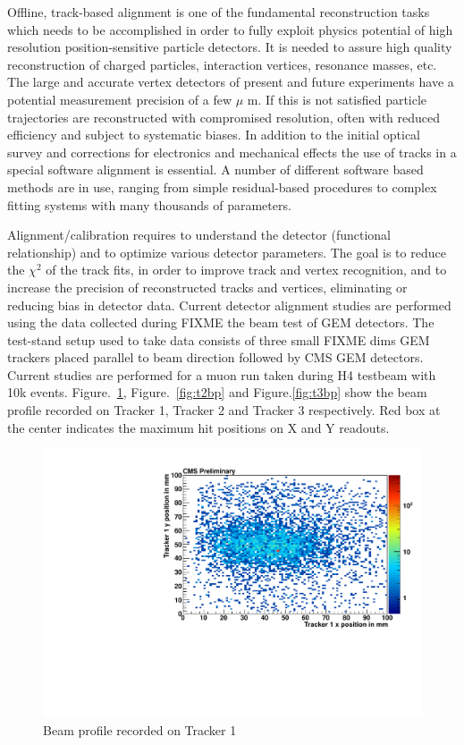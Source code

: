 Offline, track-based alignment is one of the fundamental reconstruction tasks which needs to be accomplished in order to fully exploit physics potential of high resolution position-sensitive particle detectors. It is needed to assure high quality reconstruction of charged particles, interaction vertices, resonance masses, etc. The large and accurate vertex detectors of present and future experiments have a potential measurement precision of a few $\mu$ m. If this is not satisfied particle trajectories are reconstructed with compromised resolution, often with reduced efficiency and subject to systematic biases. In addition to the initial optical survey and corrections for electronics and mechanical effects the use of tracks in a special software alignment is essential. A number of different software based methods are in use, ranging from simple residual-based procedures to complex fitting systems with many thousands of parameters.

Alignment/calibration requires to understand the detector (functional relationship) and to optimize various detector  parameters. The goal is to reduce the $\chi^{2}$ of the track fits, in order to improve track and vertex recognition, and to increase the precision of reconstructed tracks and vertices, eliminating or reducing bias in detector data.
Current detector alignment studies are performed using the data collected during FIXME the beam test of GEM detectors. The test-stand setup used to take data consists of three small FIXME dims GEM trackers placed parallel to beam direction followed by CMS GEM detectors. 
Current studies are performed for a muon run taken during H4 testbeam with 10k events.
Figure.~\ref{fig:t1bp}, Figure.~\ref{fig:t2bp} and Figure.\ref{fig:t3bp} show the beam profile recorded on Tracker 1, Tracker 2 and Tracker 3 respectively. 
Red box at the center indicates the maximum hit positions on X and Y readouts.

\begin{figure}[!htbp]
\centering
\includegraphics[width=5.1in]{figures/GEM/profile_plots_for_Tracker1_Run1897.pdf}
\caption{Beam profile recorded on Tracker 1}\label{fig:t1bp}
\end{figure}

